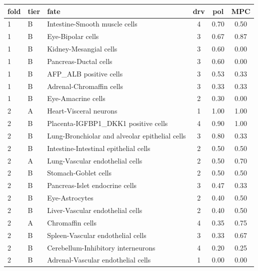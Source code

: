 \begin{table}[h]
\begin{minipage}[t]{0.49\linewidth}\centering
\begin{tabular}{@{}llp{2.6cm}ccc@{}}
\toprule
fold & tier & fate & drv & pol & MPC \\
\midrule
1 & B & Intestine-Smooth muscle cells & 4 & 0.70 & 0.50 \\
1 & B & Eye-Bipolar cells & 3 & 0.67 & 0.87 \\
1 & B & Kidney-Mesangial cells & 3 & 0.60 & 0.00 \\
1 & B & Pancreas-Ductal cells & 3 & 0.60 & 0.00 \\
1 & B & AFP\_ALB positive cells & 3 & 0.53 & 0.33 \\
1 & B & Adrenal-Chromaffin cells & 3 & 0.33 & 0.33 \\
1 & B & Eye-Amacrine cells & 2 & 0.30 & 0.00 \\
2 & A & Heart-Visceral neurons & 1 & 1.00 & 1.00 \\
2 & B & Placenta-IGFBP1\_DKK1 positive cells & 4 & 0.90 & 1.00 \\
2 & B & Lung-Bronchiolar and alveolar epithelial cells & 3 & 0.80 & 0.33 \\
2 & B & Intestine-Intestinal epithelial cells & 2 & 0.50 & 0.50 \\
2 & A & Lung-Vascular endothelial cells & 2 & 0.50 & 0.70 \\
2 & B & Stomach-Goblet cells & 2 & 0.50 & 0.50 \\
2 & B & Pancreas-Islet endocrine cells & 3 & 0.47 & 0.33 \\
2 & B & Eye-Astrocytes & 2 & 0.40 & 0.50 \\
2 & B & Liver-Vascular endothelial cells & 2 & 0.40 & 0.50 \\
2 & A & Chromaffin cells & 4 & 0.35 & 0.75 \\
2 & B & Spleen-Vascular endothelial cells & 3 & 0.33 & 0.67 \\
2 & B & Cerebellum-Inhibitory interneurons & 4 & 0.20 & 0.25 \\
2 & B & Adrenal-Vascular endothelial cells & 1 & 0.00 & 0.00 \\
\bottomrule
\end{tabular}
\end{minipage}
\end{table}

